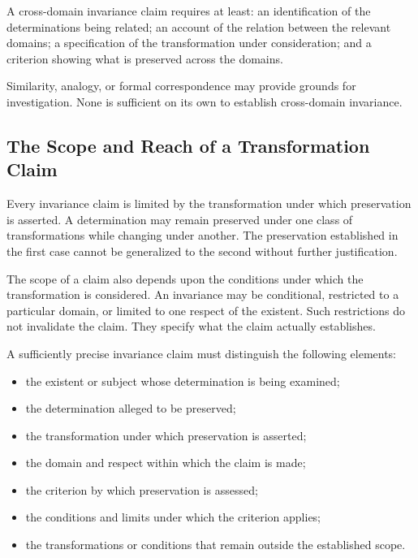A cross-domain invariance claim requires at least:
an identification of the determinations being related;
an account of the relation between the relevant domains;
a specification of the transformation under consideration;
and a criterion showing what is preserved across the
domains.

Similarity, analogy, or formal correspondence may
provide grounds for investigation. None is sufficient
on its own to establish cross-domain invariance.

\subsection{The Scope and Reach of a Transformation Claim}

Every invariance claim is limited by the transformation
under which preservation is asserted. A determination
may remain preserved under one class of transformations
while changing under another. The preservation established
in the first case cannot be generalized to the second
without further justification.

The scope of a claim also depends upon the conditions
under which the transformation is considered. An
invariance may be conditional, restricted to a particular
domain, or limited to one respect of the existent.
Such restrictions do not invalidate the claim. They
specify what the claim actually establishes.

A sufficiently precise invariance claim must distinguish
the following elements:

\begin{itemize}
    \item the existent or subject whose determination
          is being examined;
    \item the determination alleged to be preserved;
    \item the transformation under which preservation
          is asserted;
    \item the domain and respect within which the claim
          is made;
    \item the criterion by which preservation is assessed;
    \item the conditions and limits under which the
          criterion applies;
    \item the transformations or conditions that remain
          outside the established scope.
\end{itemize}



